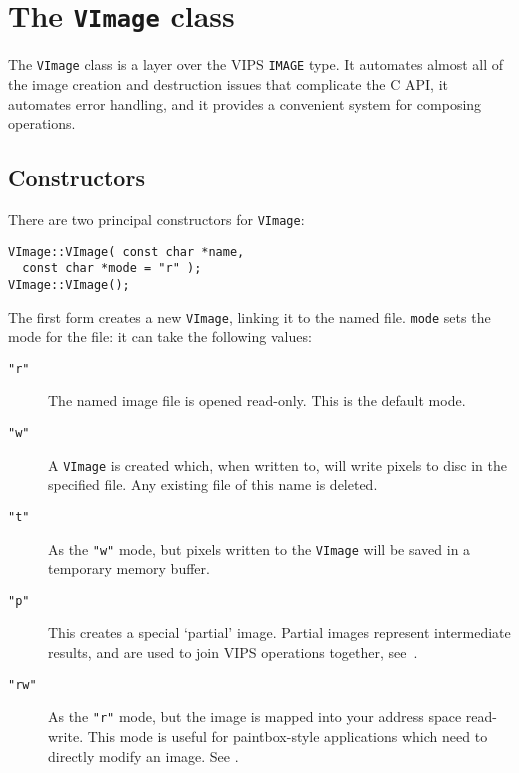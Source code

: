 \section{The \texttt{VImage} class}

The \verb+VImage+ class is a layer over the VIPS \verb+IMAGE+ type. It
automates almost all of the image creation and destruction issues that
complicate the C API, it automates error handling, and it provides a
convenient system for composing operations.

\subsection{Constructors}

There are two principal constructors for \verb+VImage+:

\begin{verbatim}
VImage::VImage( const char *name, 
  const char *mode = "r" );
VImage::VImage();
\end{verbatim}

The first form creates a new \verb+VImage+, linking it to the named file.
\verb+mode+ sets the mode for the file: it can take the following values:

\begin{description}

\item[\texttt{"r"}]
The named image file is opened read-only. This is the default mode.

\item[\texttt{"w"}]
A \verb+VImage+ is created which, when written to, will write pixels to disc
in the specified file. Any existing file of this name is deleted.

\item[\texttt{"t"}]
As the \verb'"w"' mode, but pixels written to the \verb+VImage+ will be saved
in a temporary memory buffer.

\item[\texttt{"p"}]
This creates a special `partial' image. Partial images represent
intermediate results, and are used to join VIPS operations together,
see~.

\item[\texttt{"rw"}]
As the \verb'"r"' mode, but the image is mapped into your address space
read-write. This mode is useful for paintbox-style
applications which need to directly modify an image. See .

\end{description}

